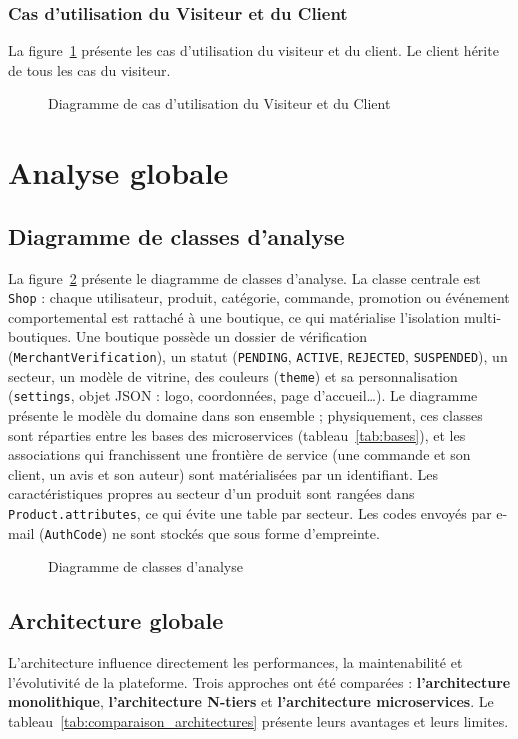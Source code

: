 \subsubsection{Cas d'utilisation du Visiteur et du Client}
La figure~\ref{fig:cu-client} présente les cas d'utilisation du visiteur et du client. Le client hérite de tous les cas du visiteur.
\begin{figure}[H]
    \centering
    \caption{Diagramme de cas d'utilisation du Visiteur et du Client}
    \label{fig:cu-client}
\end{figure}

\section{Analyse globale}
\subsection{Diagramme de classes d'analyse}
La figure~\ref{fig:classes} présente le diagramme de classes d'analyse. La classe centrale est \texttt{Shop} : chaque utilisateur, produit, catégorie, commande, promotion ou événement comportemental est rattaché à une boutique, ce qui matérialise l'isolation multi-boutiques. Une boutique possède un dossier de vérification (\texttt{MerchantVerification}), un statut (\texttt{PENDING}, \texttt{ACTIVE}, \texttt{REJECTED}, \texttt{SUSPENDED}), un secteur, un modèle de vitrine, des couleurs (\texttt{theme}) et sa personnalisation (\texttt{settings}, objet JSON : logo, coordonnées, page d'accueil\dots). Le diagramme présente le modèle du domaine dans son ensemble ; physiquement, ces classes sont réparties entre les bases des microservices (tableau~\ref{tab:bases}), et les associations qui franchissent une frontière de service (une commande et son client, un avis et son auteur) sont matérialisées par un identifiant. Les caractéristiques propres au secteur d'un produit sont rangées dans \texttt{Product.attributes}, ce qui évite une table par secteur. Les codes envoyés par e-mail (\texttt{AuthCode}) ne sont stockés que sous forme d'empreinte.
\begin{figure}[H]
    \centering
    \caption{Diagramme de classes d'analyse}
    \label{fig:classes}
\end{figure}

\subsection{Architecture globale}
L'architecture influence directement les performances, la maintenabilité et l'évolutivité de la plateforme. Trois approches ont été comparées : \textbf{l'architecture monolithique}, \textbf{l'architecture N-tiers} et \textbf{l'architecture microservices}.\newline
{}
Le tableau~\ref{tab:comparaison_architectures} présente leurs avantages et leurs limites.

